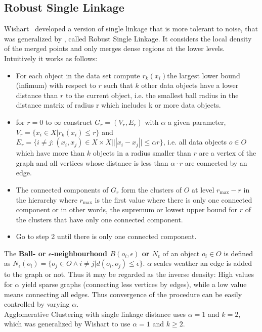 \subsection{Robust Single Linkage}\label{\positionnumber}
Wishart~\cite{wishart1969256} developed a version of single linkage that is more tolerant to noise, that was generalized by \cite{Chaudhuri2010RatesOC}, called Robust Single Linkage. It considers the local density of the merged points and only merges dense regions at the lower levels. Intuitively it works as follows:
\begin{itemize}
    \item For each object in the data set compute $r_k(x_i) $the largest lower bound (infimum) with respect to $r$ such that $k$ other data objects have a lower distance than $r$ to the current object, i.e. the smallest ball radius in the distance matrix of radius r which includes k or more data objects.
    \item for $r=0$ to $\infty$ construct $G_r = (V_r, E_r)$ with $\alpha$ a given parameter, $V_r = \{x_i \in X | r_k(x_i) \leq r\}$ and $E_r = \{i \neq j: (x_i, x_j) \in X \times X | ||x_i - x_j|| \leq \alpha r\}$, i.e. all data objects $o \in O$ which have more than $k$ objects in a radius smaller than $r$ are a vertex of the graph and all vertices whose distance is less than $\alpha \cdot r$ are connected by an edge. 
    \item The connected components of $G_r$ form the clusters of $O$ at level $r_{\text{max}} - r$ in the hierarchy where $r_{\text{max}}$ is the first value where there is only one connected component or in other words, the supremum or lowest upper bound for $r$ of the clusters that have only one connected component.
    \item Go to step 2 until there is only one connected component.
\end{itemize}
 The \textbf{Ball- or $\epsilon$-neighbourhood $B(o_i, \epsilon)$ or $N_\epsilon$} of an object $o_i \in O$ is defined as $N_\epsilon(o_i) = \{o_j \in O \wedge i \neq j | d(o_i, o_j) \leq \epsilon \}$.
$\alpha$ scales weather an edge is added to the graph or not. Thus it may be regarded as the inverse density: High values for $\alpha$ yield sparse graphs (connecting less vertices by edges), while a low value means connecting all edges. Thus convergence of the procedure can be easily controlled by varying $\alpha$. \\
Agglomerative Clustering with single linkage distance uses $\alpha = 1$ and $k = 2$, which was generalized by Wishart to use $\alpha = 1$ and $k \geq 2$. \\



